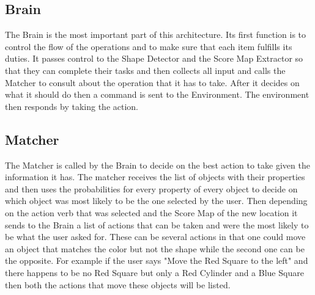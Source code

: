 \documentclass{article}
\begin{document}
    \subsection{Brain}
    The Brain is the most important part of this architecture. Its first function is to control the flow of the operations and to make sure that each item fulfills its duties. It passes control to the Shape Detector and the Score Map Extractor so that they can complete their tasks and then collects all input and calls the Matcher to consult about the operation that it has to take. After it decides on what it should do then a command is sent to the Environment. The environment then responds by taking the action.
     
    
     \subsection{Matcher}
     The Matcher is called by the Brain to decide on the best action to take given the information it has. The matcher receives the list of objects with their properties and then uses the probabilities for every property of every object to decide on which object was most likely to be the one selected by the user. Then depending on the action verb that was selected and the Score Map of the new location it sends to the Brain a list of actions that can be taken and were the most likely to be what the user asked for. These can be several actions in that one could move an object that matches the color but not the shape while the second one can be the opposite. For example if the user says "Move the Red Square to the left" and there happens to be no Red Square but only a Red Cylinder and a Blue Square then both the actions that move these objects will be listed.
	
\end{document}
